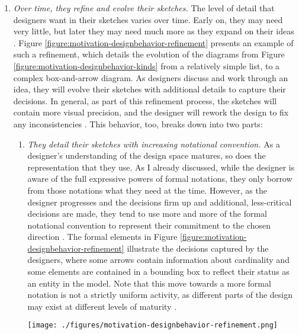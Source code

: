 \begin{enumerate}
\item \emph{Over time, they refine and evolve their sketches.} The level of detail that designers want in their sketches varies over time. Early on, they may need very little, but later they may need much more as they expand on their ideas \citep{ossher12flexible}. Figure \ref{figure:motivation-designbehavior-refinement} presents an example of such a refinement, which details the evolution of the diagrams from Figure \ref{figure:motivation-designbehavior-kinds} from a relatively simple list, to a complex box-and-arrow diagram. As designers discuss and work through an idea, they will evolve their sketches with additional details to capture their decisions. In general, as part of this refinement process, the sketches will contain more visual precision, and the designer will rework the design to fix any inconsistencies \citep{damm2000supporting}. This behavior, too, breaks down into two parts:
 \begin{enumerate}
 \item	\emph{They detail their sketches with increasing notational convention.} As a designer’s understanding of the design space matures, so does the representation that they use. As I already discussed, while the designer is aware of the full expressive powers of formal notations, they only borrow from those notations what they need at the time. However, as the designer progresses and the decisions firm up and additional, less-critical decisions are made, they tend to use more and more of the formal notational convention to represent their commitment to the chosen direction \citep{ossher2010flexible}. The formal elements in Figure \ref{figure:motivation-designbehavior-refinement} illustrate the decisions captured by the designers, where some arrows contain information about cardinality and some elements are contained in a bounding box to reflect their status as an entity in the model. Note that this move towards a more formal notation is not a strictly uniform activity, as different parts of the design may exist at different levels of maturity \citep{petre2009insights}.

\begin{figure*}[tbh]
  \centering
  \texttt{[image: ./figures/motivation-designbehavior-refinement.png]}
  \caption{Diagram from a design session that was refined from a list into a UML diagram.}
  \label{figure:motivation-designbehavior-refinement}
\end{figure*}  
 

\end{enumerate}
\end{enumerate}
